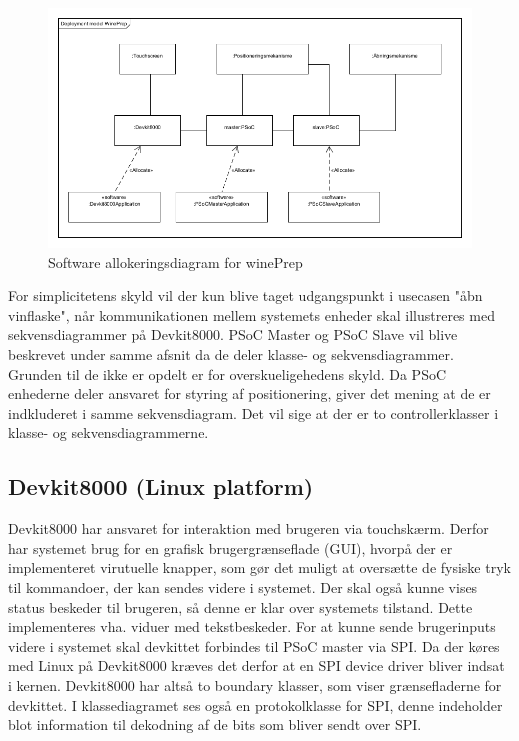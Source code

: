 \begin{figure}[H]
\includegraphics[scale=0.8]{Software/Allokeringsdiagram}
\caption{Software allokeringsdiagram for winePrep}
\end{figure}

For simplicitetens skyld vil der kun blive taget 
udgangspunkt i usecasen "åbn vinflaske", når kommunikationen mellem systemets enheder skal illustreres med sekvensdiagrammer på Devkit8000. PSoC Master
og PSoC Slave vil blive beskrevet under samme afsnit da de deler klasse- og sekvensdiagrammer. Grunden til de ikke er opdelt er for overskueligehedens skyld.
Da PSoC enhederne deler ansvaret for styring af positionering, giver det mening at de er indkluderet i samme sekvensdiagram. Det vil sige at der er to 
controllerklasser i klasse- og sekvensdiagrammerne.   

\subsection{Devkit8000 (Linux platform)}
Devkit8000 har ansvaret for interaktion med brugeren via touchskærm. Derfor har systemet brug for en grafisk brugergrænseflade (GUI), hvorpå der er
implementeret virutuelle knapper, som gør det muligt at oversætte de fysiske tryk til kommandoer, der kan sendes videre i systemet. Der skal også kunne vises
status beskeder til brugeren, så denne er klar over systemets tilstand. Dette implementeres vha. viduer med tekstbeskeder. For at kunne sende brugerinputs 
videre i systemet skal devkittet forbindes til PSoC master via SPI. Da der køres med Linux på Devkit8000 kræves det derfor at en SPI device driver bliver
indsat i kernen. Devkit8000 har altså to boundary klasser, som viser grænsefladerne for devkittet. I klassediagramet ses også en protokolklasse for SPI, denne 
indeholder blot information til dekodning af de bits som bliver sendt over SPI.   

